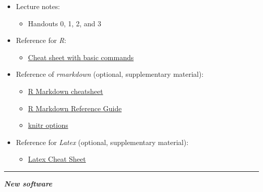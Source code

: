 \documentclass[
]{article}
\providecommand{\tightlist}{%
  \setlength{\itemsep}{0pt}\setlength{\parskip}{0pt}}
\begin{document}
\begin{itemize}
\tightlist
\item
  Lecture notes:

  \begin{itemize}
  \tightlist
  \item
    Handouts 0, 1, 2, and 3
  \end{itemize}
\item
  Reference for \emph{R}:

  \begin{itemize}
  \tightlist
  \item
    \href{https://www.rstudio.com/wp-content/uploads/2016/10/r-cheat-sheet-3.pdf}{Cheat
    sheet with basic commands}
  \end{itemize}
\item
  Reference of \emph{rmarkdown} (optional, supplementary material):

  \begin{itemize}
  \tightlist
  \item
    \href{https://www.rstudio.com/wp-content/uploads/2016/03/rmarkdown-cheatsheet-2.0.pdf}{R
    Markdown cheatsheet}\\
  \item
    \href{http://442r58kc8ke1y38f62ssb208-wpengine.netdna-ssl.com/wp-content/uploads/2015/03/rmarkdown-reference.pdf}{R
    Markdown Reference Guide}\\
  \item
    \href{https://yihui.name/knitr/options}{knitr options}
  \end{itemize}
\item
  Reference for \emph{Latex} (optional, supplementary material):

  \begin{itemize}
  \tightlist
  \item
    \href{https://wch.github.io/latexsheet/latexsheet-a4.pdf}{Latex
    Cheat Sheet}
  \end{itemize}
\end{itemize}

\begin{center}\rule{0.5\linewidth}{0.5pt}\end{center}

\textbf{\emph{New software}}
\end{document}
